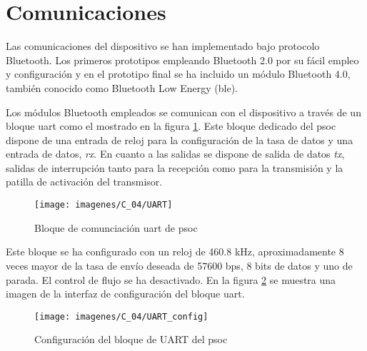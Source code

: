 %
%
 
\section{Comunicaciones}


Las comunicaciones del dispositivo se han implementado bajo protocolo Bluetooth. Los primeros prototipos empleando Bluetooth 2.0 por su fácil empleo y configuración y en el prototipo final se ha incluido un módulo Bluetooth 4.0, también conocido como Bluetooth Low Energy (\acrshort{ble}).

Los módulos Bluetooth empleados se comunican con el dispositivo a través de un bloque \acrshort{uart} como el mostrado en la figura \ref{fig:uart}. Este bloque dedicado del \acrshort{psoc} dispone de una entrada de reloj para la configuración de la tasa de datos y  una entrada de datos, \textit{rx}. En cuanto a las salidas se dispone de salida de datos \textit{tx}, salidas de interrupción tanto para la recepción como para la transmisión y la patilla de activación del transmisor.

\begin{figure}[!ht]
	\center
	\texttt{[image: imagenes/C\_04/UART]}
	\caption{Bloque de comunciación \acrshort{uart} de \acrshort{psoc}}
	\label{fig:uart}
\end{figure}

Este bloque se ha configurado con un reloj de 460.8 kHz, aproximadamente 8 veces mayor de la tasa de envío deseada de 57600 bps, 8 bits de datos y uno de parada. El control de flujo se ha desactivado. En la figura \ref{fig:uart_config} se muestra una imagen de la interfaz de configuración del bloque \acrshort{uart}.


\begin{figure}[!ht]
	\center
	\texttt{[image: imagenes/C\_04/UART\_config]}
	\caption{Configuración del bloque de UART del \acrshort{psoc}}
	\label{fig:uart_config}
\end{figure}

